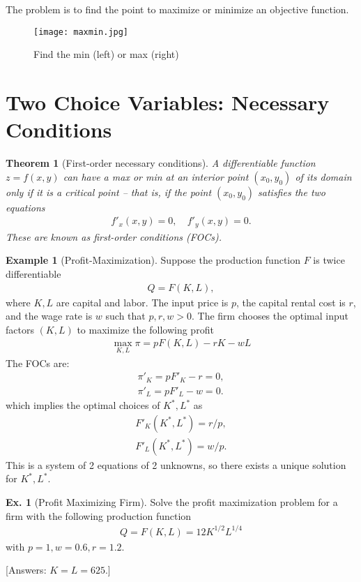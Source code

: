 \documentclass[10pt,a4paper]{book}
\newtheorem{theorem}{Theorem}[section]
\theoremstyle{definition}\newtheorem{definition}{Definition}
\theoremstyle{definition}\newtheorem{fact}{Fact}
\theoremstyle{definition}\newtheorem{ex}{Ex.}
\theoremstyle{definition}\newtheorem{project}{Project}
\theoremstyle{definition}\newtheorem{problem}{Problem}
\theoremstyle{definition}\newtheorem{example}{Example}
\numberwithin{theorem}{chapter}
\numberwithin{corollary}{chapter}
\numberwithin{assumption}{chapter}
\numberwithin{definition}{chapter}
\numberwithin{prop}{chapter}
\numberwithin{notation}{chapter}
\numberwithin{problem}{chapter}
\numberwithin{example}{chapter}
\numberwithin{fact}{chapter}
\numberwithin{ex}{chapter}
\newenvironment{ftheorem}
{\begin{mdframed}\begin{theorem}}
		{\end{theorem}\end{mdframed}}
\begin{document}
	The problem is to find the point to maximize or minimize an objective function.
	\begin{figure}[ht]
		\centering
		\texttt{[image: maxmin.jpg]}
		\caption{Find the min (left) or max (right)}
	\end{figure}
	
	\section{Two Choice Variables: Necessary Conditions}
	
	\begin{ftheorem}[First-order necessary conditions]
		A differentiable function $z=f(x,y)$ can have a max or min at an interior point $(x_0, y_0)$ of its domain only if it is a critical point -- that is, if the point $(x_0, y_0)$ satisfies the two equations
		\begin{align*}
			& f'_x (x,y) = 0, \ &f'_y(x,y) = 0. &                
		\end{align*}
		These are known as first-order conditions (FOCs).
	\end{ftheorem}
	
	\begin{example}[Profit-Maximization]
		
		Suppose the production function $F$ is twice differentiable
		\begin{align*}
			Q = F(K,L), 
		\end{align*}
		where $K, L$ are capital and labor. The input price is $p$, the capital rental cost is $r$, and the wage rate is $w$ such that $p,r,w > 0$. The firm chooses the optimal input factors $(K, L)$ to maximize the following profit
		\begin{align*}
			\max_{K,L} \pi = p F(K,L) - rK - wL 
		\end{align*}
		The FOCs are:
		\begin{align*}
			\pi'_K = p F'_K - r = 0, \\
			\pi'_L = p F'_L - w = 0. 
		\end{align*}
		which implies the optimal choices of $K^*, L^*$ as
		\begin{align*}
			F'_K (K^*, L^*) = r/p, \\
			F'_L (K^*, L^*) = w/p. 
		\end{align*}
		This is a system of 2 equations of 2 unknowns, so there exists a unique solution for $K^*, L^*$.
	\end{example}
	
	\begin{ex}[Profit Maximizing Firm] 
		Solve the profit maximization problem for a firm with the following production function
		\begin{align*}
			Q = F(K,L) = 12 K^{1/2} L^{1/4} 
		\end{align*}
		with $p=1, w = 0.6, r = 1.2$. \label{ex:necessary}
		
		[Answers: $K=L=625$.]
	\end{ex}
	
\end{document}
